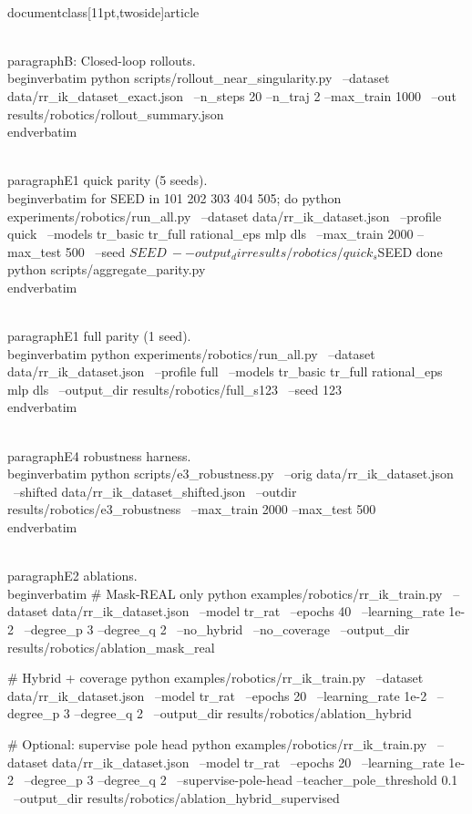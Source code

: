 \\documentclass[11pt,twoside]{article}
\begin{document}
\\paragraph{B: Closed-loop rollouts.}
\\begin{verbatim}
python scripts/rollout_near_singularity.py \
  --dataset data/rr_ik_dataset_exact.json \
  --n_steps 20 --n_traj 2 --max_train 1000 \
  --out results/robotics/rollout_summary.json
\\end{verbatim}

\\paragraph{E1 quick parity (5 seeds).}
\\begin{verbatim}
for SEED in 101 202 303 404 505; do
python experiments/robotics/run_all.py \
  --dataset data/rr_ik_dataset.json \
  --profile quick \
  --models tr_basic tr_full rational_eps mlp dls \
  --max_train 2000 --max_test 500 \
  --seed $SEED \
  --output_dir results/robotics/quick_s${SEED}
done
python scripts/aggregate_parity.py
\\end{verbatim}

\\paragraph{E1 full parity (1 seed).}
\\begin{verbatim}
python experiments/robotics/run_all.py \
  --dataset data/rr_ik_dataset.json \
  --profile full \
  --models tr_basic tr_full rational_eps mlp dls \
  --output_dir results/robotics/full_s123 \
  --seed 123
\\end{verbatim}

\\paragraph{E4 robustness harness.}
\\begin{verbatim}
python scripts/e3_robustness.py \
  --orig data/rr_ik_dataset.json \
  --shifted data/rr_ik_dataset_shifted.json \
  --outdir results/robotics/e3_robustness \
  --max_train 2000 --max_test 500
\\end{verbatim}

\\paragraph{E2 ablations.}
\\begin{verbatim}
# Mask-REAL only
python examples/robotics/rr_ik_train.py \
  --dataset data/rr_ik_dataset.json \
  --model tr_rat \
  --epochs 40 \
  --learning_rate 1e-2 \
  --degree_p 3 --degree_q 2 \
  --no_hybrid \
  --no_coverage \
  --output_dir results/robotics/ablation_mask_real

# Hybrid + coverage
python examples/robotics/rr_ik_train.py \
  --dataset data/rr_ik_dataset.json \
  --model tr_rat \
  --epochs 20 \
  --learning_rate 1e-2 \
  --degree_p 3 --degree_q 2 \
  --output_dir results/robotics/ablation_hybrid

# Optional: supervise pole head
python examples/robotics/rr_ik_train.py \
  --dataset data/rr_ik_dataset.json \
  --model tr_rat \
  --epochs 20 \
  --learning_rate 1e-2 \
  --degree_p 3 --degree_q 2 \
  --supervise-pole-head --teacher_pole_threshold 0.1 \
  --output_dir results/robotics/ablation_hybrid_supervised
\end{document}
